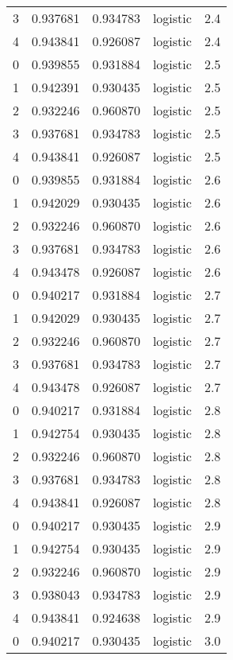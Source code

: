 \begin{tabular}{rrrlr}
     3 & 0.937681 & 0.934783 & logistic &        2.4 \\
     4 & 0.943841 & 0.926087 & logistic &        2.4 \\
     0 & 0.939855 & 0.931884 & logistic &        2.5 \\
     1 & 0.942391 & 0.930435 & logistic &        2.5 \\
     2 & 0.932246 & 0.960870 & logistic &        2.5 \\
     3 & 0.937681 & 0.934783 & logistic &        2.5 \\
     4 & 0.943841 & 0.926087 & logistic &        2.5 \\
     0 & 0.939855 & 0.931884 & logistic &        2.6 \\
     1 & 0.942029 & 0.930435 & logistic &        2.6 \\
     2 & 0.932246 & 0.960870 & logistic &        2.6 \\
     3 & 0.937681 & 0.934783 & logistic &        2.6 \\
     4 & 0.943478 & 0.926087 & logistic &        2.6 \\
     0 & 0.940217 & 0.931884 & logistic &        2.7 \\
     1 & 0.942029 & 0.930435 & logistic &        2.7 \\
     2 & 0.932246 & 0.960870 & logistic &        2.7 \\
     3 & 0.937681 & 0.934783 & logistic &        2.7 \\
     4 & 0.943478 & 0.926087 & logistic &        2.7 \\
     0 & 0.940217 & 0.931884 & logistic &        2.8 \\
     1 & 0.942754 & 0.930435 & logistic &        2.8 \\
     2 & 0.932246 & 0.960870 & logistic &        2.8 \\
     3 & 0.937681 & 0.934783 & logistic &        2.8 \\
     4 & 0.943841 & 0.926087 & logistic &        2.8 \\
     0 & 0.940217 & 0.930435 & logistic &        2.9 \\
     1 & 0.942754 & 0.930435 & logistic &        2.9 \\
     2 & 0.932246 & 0.960870 & logistic &        2.9 \\
     3 & 0.938043 & 0.934783 & logistic &        2.9 \\
     4 & 0.943841 & 0.924638 & logistic &        2.9 \\
     0 & 0.940217 & 0.930435 & logistic &        3.0 \\

\end{tabular}
